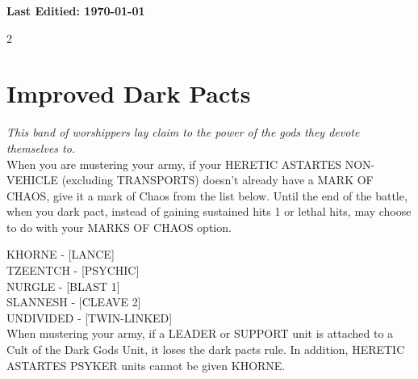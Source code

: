 \documentclass{report}
\begin{document}
\small\textbf{Last Editied: \today}
\vspace{8mm}
\begin{multicols}{2}
\color[HTML]{000000}\section{Improved Dark Pacts}\label{sec:rule}%
\textit{This band of worshippers lay claim to the power of the gods they devote themselves to.}\\
\small When you are mustering your army, if your HERETIC ASTARTES NON-VEHICLE (excluding TRANSPORTS) doesn't already have a MARK OF CHAOS, give it a mark of Chaos from the list below. Until the end of the battle, when you dark pact, instead of gaining sustained hits 1 or lethal hits, may choose to do with your MARKS OF CHAOS option.

KHORNE - [LANCE]\\
TZEENTCH - [PSYCHIC]\\
NURGLE - [BLAST 1]\\
SLANNESH - [CLEAVE 2]\\
UNDIVIDED - [TWIN-LINKED]\\

When mustering your army, if a LEADER or SUPPORT unit is attached to a Cult of the Dark Gods Unit, it loses the dark pacts rule.  In addition, HERETIC ASTARTES PSYKER units cannot be given KHORNE.


\end{multicols}
\end{document}
